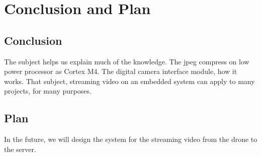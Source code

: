 \documentclass[D:/Latex/Internship/Report/Latex/Report.tex]{subfiles}
\begin{document}
  \chapter{Conclusion and Plan}
  \section{Conclusion}
      The subject helps us explain much of the knowledge. The jpeg compress on low power processor as Cortex M4. The digital camera interface module, how it works. That subject, streaming video on an embedded system can apply to many projects, for many purposes.
  \section{Plan}
      In the future, we will design the system for the streaming video from the drone to the server.  
\end{document}
